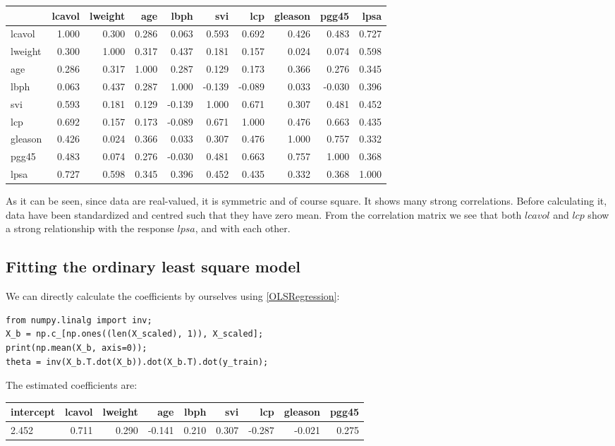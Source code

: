 \documentclass[12pt, letterpaper]{article}
\theoremstyle{definition}
\begin{document}
\begin{tabular}{lrrrrrrrrr}
\toprule
{} &  lcavol &  lweight &    age &   lbph &    svi &    lcp &  gleason &  pgg45 &   lpsa \\
\midrule
lcavol  &   1.000 &    0.300 &  0.286 &  0.063 &  0.593 &  0.692 &    0.426 &  0.483 &  0.727 \\
lweight &   0.300 &    1.000 &  0.317 &  0.437 &  0.181 &  0.157 &    0.024 &  0.074 &  0.598 \\
age     &   0.286 &    0.317 &  1.000 &  0.287 &  0.129 &  0.173 &    0.366 &  0.276 &  0.345 \\
lbph    &   0.063 &    0.437 &  0.287 &  1.000 & -0.139 & -0.089 &    0.033 & -0.030 &  0.396 \\
svi     &   0.593 &    0.181 &  0.129 & -0.139 &  1.000 &  0.671 &    0.307 &  0.481 &  0.452 \\
lcp     &   0.692 &    0.157 &  0.173 & -0.089 &  0.671 &  1.000 &    0.476 &  0.663 &  0.435 \\
gleason &   0.426 &    0.024 &  0.366 &  0.033 &  0.307 &  0.476 &    1.000 &  0.757 &  0.332 \\
pgg45   &   0.483 &    0.074 &  0.276 & -0.030 &  0.481 &  0.663 &    0.757 &  1.000 &  0.368 \\
lpsa    &   0.727 &    0.598 &  0.345 &  0.396 &  0.452 &  0.435 &    0.332 &  0.368 &  1.000 \\
\bottomrule
\end{tabular}
As it can be seen, since data are real-valued, it is symmetric and of course square. It shows many strong correlations. Before calculating it, data have been standardized and centred such that they have zero mean. From the correlation matrix we see that both $lcavol$ and $lcp$ show a strong relationship with the response $lpsa$, and with each other.

\subsection{Fitting the ordinary least square model}
We can directly calculate the coefficients by ourselves using \autoref{OLSRegression}:
\begin{lstlisting}
from numpy.linalg import inv;
X_b = np.c_[np.ones((len(X_scaled), 1)), X_scaled];
print(np.mean(X_b, axis=0));
theta = inv(X_b.T.dot(X_b)).dot(X_b.T).dot(y_train);
\end{lstlisting}
The estimated coefficients are:

\begin{tabular}{lr|r|r|r|r|r|r|r|}
\toprule
 intercept &  lcavol &  lweight &    age &  lbph &    svi &    lcp &  gleason &  pgg45 \\
\midrule
2.452 &  0.711 &  0.290 & -0.141  &  0.210 &  0.307  & -0.287 & -0.021 &  0.275 \\
\bottomrule
\end{tabular}
\end{document}
